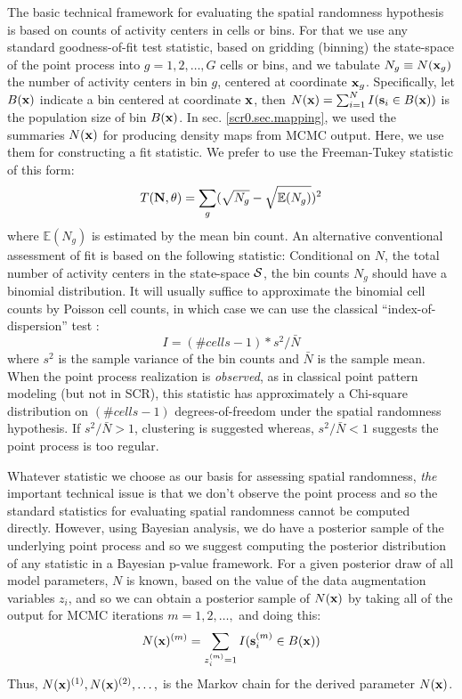 The basic technical framework for evaluating the spatial randomness
hypothesis is based on counts of activity centers in cells or bins.
For that we use any standard goodness-of-fit test statistic, based on
gridding (binning) the state-space of the point process into
$g=1,2,\ldots,G$ cells or bins, and we tabulate $N_{g} \equiv N({\bf
  x}_{g})$ the number of activity centers in bin $g$, centered at
coordinate ${\bf x}_{g}$.
Specifically, let $B({\bf x})$ indicate a bin centered at
coordinate ${\bf x}$, then $N({\bf x})=\sum_{i=1}^{N} I({\bf s}_{i} \in
B({\bf x}))$ is the population size of bin $B({\bf x})$.
In
sec. \ref{scr0.sec.mapping}, we used the summaries $N({\bf x})$
for producing density maps from MCMC output. Here, we use them for
constructing a fit statistic.
We prefer to use the
Freeman-Tukey statistic of this form:
\[
T({\bf N}, \theta) =  \sum_{g}  (\sqrt{N_{g}} - \sqrt{\mathbb{E}(N_{g})})^{2}
\]
where $\mathbb{E}(N_{g})$ is estimated by the mean bin count.  An
alternative conventional assessment of fit is based on the following
statistic: Conditional on $N$, the total number of activity centers in
the state-space ${\cal S}$, the bin counts $N_{g}$ should have a
binomial distribution.  It will usually suffice to approximate the
binomial cell counts by Poisson cell counts, in which case we can use
the classical ``index-of-dispersion'' test
\citep[][p. 87]{illian_etal:2008}:
\[
   I =  (\# cells -1)*s^2/\bar{N}
\]
where $s^{2}$ is the sample variance of the bin counts and $\bar{N}$
is the sample mean. When the point process realization is {\it
  observed}, as in classical point pattern modeling (but not in SCR),
this statistic has approximately a Chi-square distribution on $(\#
cells - 1)$ degrees-of-freedom under the spatial randomness
hypothesis.  If $s^2/\bar{N} > 1$, clustering is suggested whereas,
$s^2/\bar{N} <1$ suggests the point process is too regular.


Whatever statistic we choose as our basis for assessing spatial
randomness, {\it the} important technical issue is that we don't
observe the point process and so the standard statistics for
evaluating spatial randomness cannot be computed directly.  However,
using Bayesian analysis, we do have a posterior sample of the
underlying point process and so we suggest computing the posterior
distribution of any statistic in a Bayesian p-value framework.
For a given
posterior draw of all model parameters, $N$ is known, based on the
value of the data augmentation variables $z_{i}$, and so we can obtain
a posterior sample of $N({\bf x})$ by taking all of the output for
MCMC iterations $m=1,2,\ldots,$ and doing this:
\[
   N({\bf x})^{(m)} = \sum_{z_{i}^{(m)}=1} I({\bf s}_{i}^{(m)} \in B({\bf x}))
\]
Thus, $N({\bf x})^{(1)}, N({\bf x})^{(2)}, \ldots,$ is the Markov
chain for the derived parameter $N({\bf x})$.


